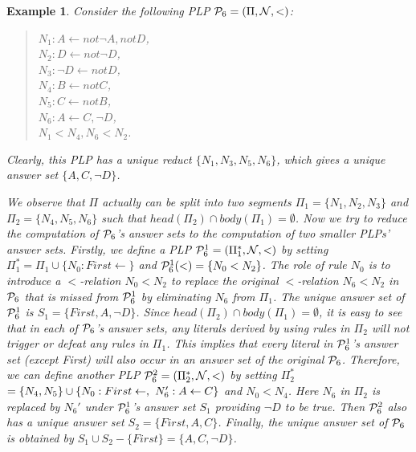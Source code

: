\documentclass{tlp}
\newtheorem{example}{Example} %
\begin{document}
\begin{example}
Consider the following PLP ${\cal P}_{6}=(\Pi, {\cal N}, <)$:
\begin{quote}
$N_{1}: A\leftarrow not \neg A, not D$, \\
\hspace*{.1in} $N_{2}: D\leftarrow not \neg D$,\\
\hspace*{.1in} $N_{3}: \neg D\leftarrow not D$,\\
\hspace*{.1in} $N_{4}: B\leftarrow not C$,\\
\hspace*{.1in} $N_{5}: C\leftarrow not B$, \\
\hspace*{.1in} $N_{6}: A\leftarrow C, \neg D$,\\
\hspace*{.1in} $N_{1}<N_{4}, N_{6}<N_{2}$.
\end{quote}
Clearly, this PLP has a unique reduct $\{N_{1}, N_{3}, N_{5}, N_{6}\}$, which gives
a unique answer set $\{A, C, \neg D\}$.

We observe that $\Pi$ actually can be split into two segments
$\Pi_{1}=\{N_{1}, N_{2}, N_{3}\}$ and $\Pi_{2}=\{N_{4}, N_{5}, N_{6}\}$ such that
$head(\Pi_{2})\cap body(\Pi_{1})=\emptyset$. Now we try to reduce
the computation of ${\cal P}_{6}$'s answer sets to the computation of two
smaller PLPs' answer sets. Firstly, we define a PLP
${\cal P}_{6}^{1}=(\Pi_{1}^{*}, {\cal N}, <)$ by setting
$\Pi_{1}^{*}=\Pi_{1}\cup\{N_{0}: First\leftarrow\}$ and
${\cal P}_{6}^{1}(<)=\{N_{0}<N_{2}\}$.
The role of rule $N_{0}$ is to introduce a $<$-relation
$N_{0}<N_{2}$ to replace the original $<$-relation $N_{6}<N_{2}$ in ${\cal P}_{6}$
that is missed from ${\cal P}_{6}^{1}$ by eliminating $N_{6}$ from $\Pi_{1}$.
The unique answer set of ${\cal P}_{6}^{1}$ is $S_{1}=\{First, A, \neg D\}$.
Since $head(\Pi_{2})\cap body(\Pi_{1})=\emptyset$, it is easy to see that
in each of ${\cal P}_{6}$'s answer sets,
any literals derived by using rules in $\Pi_{2}$ will
not trigger or defeat any rules in $\Pi_{1}$. This implies that every literal in
${\cal P}_{6}^{1}$'s answer set (except {\em First}) will also occur in an answer set of
the original ${\cal P}_{6}$. Therefore, we can define another PLP
${\cal P}_{6}^{2}=(\Pi_{2}^{*}, {\cal N}, <)$ by setting
$\Pi_{2}^{*}$
$=\{N_{4}, N_{5}\}\cup\{N_{0}: First\leftarrow, \hspace*{.05in} N_{6}': A\leftarrow C\}$
and $N_{0}<N_{4}$. Here $N_{6}$ in $\Pi_{2}$ is
replaced by $N_{6}'$ under ${\cal P}_{6}^{1}$'s
answer set $S_{1}$ providing $\neg D$ to be true. Then
${\cal P}_{6}^{2}$ also has a unique answer set $S_{2}=\{First, A, C\}$.
Finally,  the unique answer set of
${\cal P}_{6}$ is obtained by $S_{1}\cup S_{2}-\{First\}=\{A, C, \neg D\}$.
\end{example}
\end{document}
